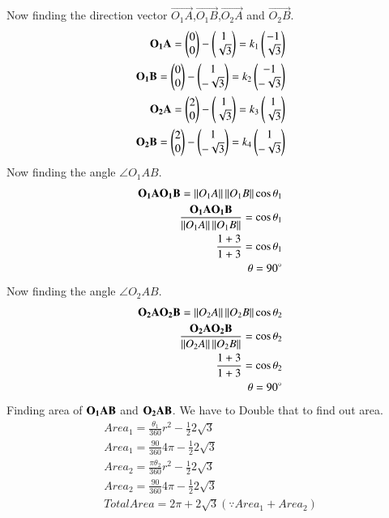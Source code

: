 \documentclass[journal,12pt,twocolumn]{IEEEtran}
\begin{document}
 Now finding the direction vector $\vec{O_1A}$,$\vec{O_1B}$,$\vec{O_2A}$ and $\vec{O_2B}$.
 \begin{align}
\mathbf{O_1A}=\begin{pmatrix}0\\0\end{pmatrix}-\begin{pmatrix}1\\\sqrt{3}\end{pmatrix}=k_1\begin{pmatrix}-1\\\sqrt{3}\end{pmatrix}\\
\mathbf{O_1B}=\begin{pmatrix}0\\0\end{pmatrix}-\begin{pmatrix}1\\-\sqrt{3}\end{pmatrix}=k_2\begin{pmatrix}-1\\-\sqrt{3}\end{pmatrix}\\
\mathbf{O_2A}=\begin{pmatrix}2\\0\end{pmatrix}-\begin{pmatrix}1\\\sqrt{3}\end{pmatrix}=k_3\begin{pmatrix}1\\\sqrt{3}\end{pmatrix}\\
\mathbf{O_2B}=\begin{pmatrix}2\\0\end{pmatrix}-\begin{pmatrix}1\\-\sqrt{3}\end{pmatrix}=k_4\begin{pmatrix}1\\-\sqrt{3}\end{pmatrix}
\end{align}
Now finding the angle $\angle{O_1AB}$.
\begin{align}
    \mathbf{O_1A}\mathbf{O_1B}=\left\lVert O_1A\right\rVert\left\lVert O_1B\right\rVert\cos\theta_1\\
    \frac{\mathbf{O_1A}\mathbf{O_1B}}{\left\lVert O_1A\right\rVert\left\lVert O_1B\right\rVert}=\cos\theta_1\\
    \frac{1+3}{1+3}=\cos\theta_1\\
    \theta=90^{\circ}
\end{align}
Now finding the angle $\angle{O_2AB}$.
\begin{align}
    \mathbf{O_2A}\mathbf{O_2B}=\left\lVert O_2A\right\rVert\left\lVert O_2B\right\rVert\cos\theta_2\\
    \frac{\mathbf{O_2A}\mathbf{O_2B}}{\left\lVert O_2A\right\rVert\left\lVert O_2B\right\rVert}=\cos\theta_2\\
    \frac{1+3}{1+3}=\cos\theta_2\\
    \theta=90^{\circ}
\end{align}
Finding area of $\bf{O_1AB}$ and $\bf{O_2AB}$. We have to Double that to find out area.
 \begin{align}
Area_1=\frac{\theta_1}{360}r^2-\frac{1}{2}2\sqrt{3}\\
Area_1=\frac{90}{360}4\pi-\frac{1}{2}2\sqrt{3}\\
Area_2=\frac{\pi\theta_2}{360}r^2-\frac{1}{2}2\sqrt{3}\\
Area_2=\frac{90}{360}4\pi-\frac{1}{2}2\sqrt{3}\\
Total Area=2\pi+2\sqrt{3}{(\because Area_1+Area_2)}
\end{align}
\end{document}
